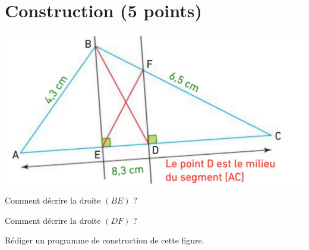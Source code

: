 \section{Construction (5 points)}

\begin{center}
	\includegraphics[scale=0.3]{img/triangle}
\end{center}

\begin{questions}
	
	\question[1\half] Comment décrire la droite $(BE)$ ?
	
	\question[1\half] Comment décrire la droite $(DF)$ ?
	
	\question[2] Rédiger un programme de construction de cette figure.
\end{questions}
  